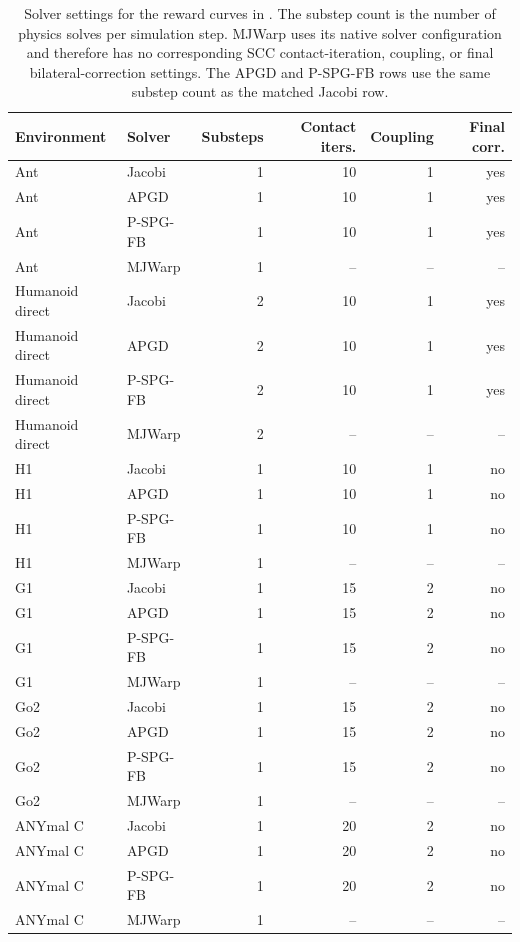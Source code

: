 \begin{table}[t]
\centering
\caption{Solver settings for the reward curves in . The
substep count is the number of physics solves per simulation step. MJWarp uses
its native solver configuration and therefore has no corresponding SCC
contact-iteration, coupling, or final bilateral-correction settings. The
APGD and P-SPG-FB rows use the same substep count as the matched Jacobi row.}
\label{tab:rl-solver-parameters}
\small
\begin{tabular}{llrrrr}
\toprule
Environment & Solver & Substeps & Contact iters. & Coupling & Final corr. \\
\midrule
Ant & Jacobi & 1 & 10 & 1 & yes \\
Ant & APGD & 1 & 10 & 1 & yes \\
Ant & P-SPG-FB & 1 & 10 & 1 & yes \\
Ant & MJWarp & 1 & -- & -- & -- \\
Humanoid direct & Jacobi & 2 & 10 & 1 & yes \\
Humanoid direct & APGD & 2 & 10 & 1 & yes \\
Humanoid direct & P-SPG-FB & 2 & 10 & 1 & yes \\
Humanoid direct & MJWarp & 2 & -- & -- & -- \\
H1 & Jacobi & 1 & 10 & 1 & no \\
H1 & APGD & 1 & 10 & 1 & no \\
H1 & P-SPG-FB & 1 & 10 & 1 & no \\
H1 & MJWarp & 1 & -- & -- & -- \\
G1 & Jacobi & 1 & 15 & 2 & no \\
G1 & APGD & 1 & 15 & 2 & no \\
G1 & P-SPG-FB & 1 & 15 & 2 & no \\
G1 & MJWarp & 1 & -- & -- & -- \\
Go2 & Jacobi & 1 & 15 & 2 & no \\
Go2 & APGD & 1 & 15 & 2 & no \\
Go2 & P-SPG-FB & 1 & 15 & 2 & no \\
Go2 & MJWarp & 1 & -- & -- & -- \\
ANYmal C & Jacobi & 1 & 20 & 2 & no \\
ANYmal C & APGD & 1 & 20 & 2 & no \\
ANYmal C & P-SPG-FB & 1 & 20 & 2 & no \\
ANYmal C & MJWarp & 1 & -- & -- & -- \\
\bottomrule
\end{tabular}
\end{table}


